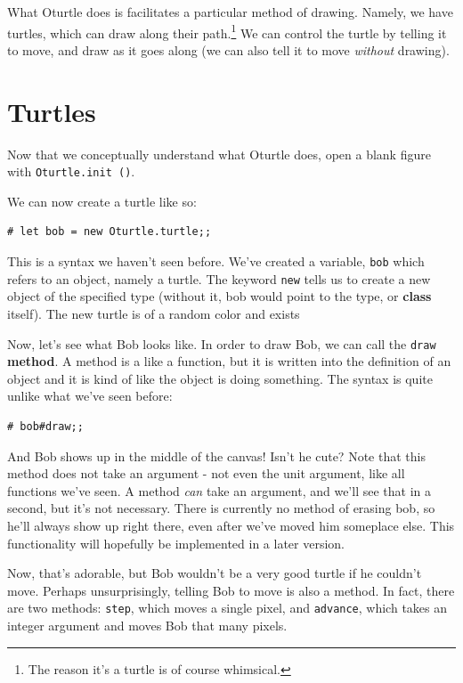 \documentclass[10pt]{book}
\begin{document}
{What Oturtle does is facilitates a particular method of drawing. Namely, we have turtles, which can draw along their path.\footnote{The reason it's a turtle is of course whimsical.} We can control the turtle by telling it to move, and draw as it goes along (we can also tell it to move {\it without} drawing).

\section{Turtles}

Now that we conceptually understand what Oturtle does, open a blank figure with {\tt Oturtle.init ()}.

We can now create a turtle like so:

\beforeverb
\begin{verbatim}
# let bob = new Oturtle.turtle;;
\end{verbatim}
\afterverb

This is a syntax we haven't seen before. We've created a variable, {\tt bob} which refers to an object, namely a turtle. The keyword {\tt new} tells us to create a new object of the specified type (without it, bob would point to the type, or {\bf class} itself). The new turtle is of a random color and exists

Now, let's see what Bob looks like. In order to draw Bob, we can call the {\tt draw} {\bf method}. A method is a like a function, but it is written into the definition of an object and it is kind of like the object is doing something. The syntax is quite unlike what we've seen before:

\beforeverb
\begin{verbatim}
# bob#draw;;
\end{verbatim}
\afterverb

And Bob shows up in the middle of the canvas! Isn't he cute? Note that this method does not take an argument - not even the unit argument, like all functions we've seen. A method {\it can} take an argument, and we'll see that in a second, but it's not necessary. There is currently no method of erasing bob, so he'll always show up right there, even after we've moved him someplace else. This functionality will hopefully be implemented in a later version.

Now, that's adorable, but Bob wouldn't be a very good turtle if he couldn't move. Perhaps unsurprisingly, telling Bob to move is also a method. In fact, there are two methods: {\tt step}, which moves a single pixel, and {\tt advance}, which takes an integer argument and moves Bob that many pixels.

}
\end{document}
